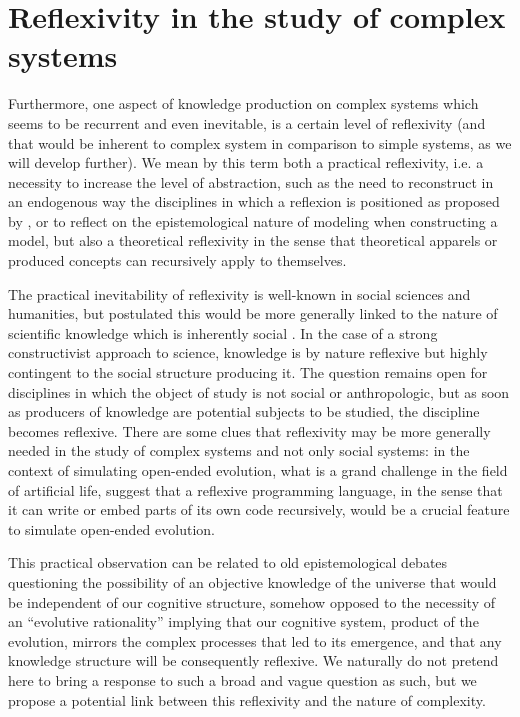 \section{Reflexivity in the study of complex systems}




Furthermore, one aspect of knowledge production on complex systems which seems to be recurrent and even inevitable, is a certain level of reflexivity (and that would be inherent to complex system in comparison to simple systems, as we will develop further). We mean by this term both a practical reflexivity, i.e. a necessity to increase the level of abstraction, such as the need to reconstruct in an endogenous way the disciplines in which a reflexion is positioned as proposed by \cite{2017arXiv171200805R}, or to reflect on the epistemological nature of modeling when constructing a model, but also a theoretical reflexivity in the sense that theoretical apparels or produced concepts can recursively apply to themselves.

The practical inevitability of reflexivity is well-known in social sciences and humanities, but \cite{bourdieu2004science} postulated this would be more generally linked to the nature of scientific knowledge which is inherently social \cite{maton2003reflexivity}. In the case of a strong constructivist approach to science, knowledge is by nature reflexive but highly contingent to the social structure producing it. The question remains open for disciplines in which the object of study is not social or anthropologic, but as soon as producers of knowledge are potential subjects to be studied, the discipline becomes reflexive. There are some clues that reflexivity may be more generally needed in the study of complex systems and not only social systems: in the context of simulating open-ended evolution, what is a grand challenge in the field of artificial life, \cite{banzhaf2016defining} suggest that a reflexive programming language, in the sense that it can write or embed parts of its own code recursively, would be a crucial feature to simulate open-ended evolution.


This practical observation can be related to old epistemological debates questioning the possibility of an objective knowledge of the universe that would be independent of our cognitive structure, somehow opposed to the necessity of an ``evolutive rationality'' implying that our cognitive system, product of the evolution, mirrors the complex processes that led to its emergence, and that any knowledge structure will be consequently reflexive. We naturally do not pretend here to bring a response to such a broad and vague question as such, but we propose a potential link between this reflexivity and the nature of complexity. 







